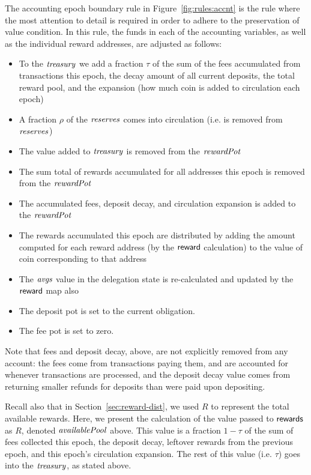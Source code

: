 The accounting epoch boundary rule in Figure~\ref{fig:rules:accnt} is the rule
where the most attention to detail is required in order to adhere to the
preservation of value condition. In this rule, the funds in each of the
accounting variables, as well as the individual reward addresses, are adjusted
as follows:

\begin{itemize}
\item To the $\mathit{treasury}$ we add a fraction $\tau$ of the sum of
the fees accumulated from transactions this epoch, the decay amount
of all current deposits, the total reward pool, and the expansion (how much
coin is added to circulation each epoch)
\item A fraction $\rho$ of the $\mathit{reserves}$ comes into circulation (i.e.
is removed from $\mathit{reserves}$)
\item The value added to $\mathit{treasury}$ is removed from the $\mathit{rewardPot}$
\item The sum total of rewards accumulated for all addresses this epoch
is removed from the $\mathit{rewardPot}$
\item The accumulated fees, deposit decay, and circulation expansion is
added to the $\mathit{rewardPot}$
\item The rewards accumulated this epoch are distributed by
adding the amount computed for each reward address (by the $\mathsf{reward}$ calculation)
to the value of coin corresponding to that address
\item The $\mathit{avgs}$ value in the delegation state is re-calculated and
updated by the $\mathsf{reward}$ map also
\item The deposit pot is set to the current obligation.
\item The fee pot is set to zero.
\end{itemize}

Note that fees and deposit decay, above, are not explicitly removed from any account:
the fees come from transactions paying them, and are accounted for whenever
transactions are processed, and the deposit decay value comes from returning
smaller refunds for deposits than were paid upon depositing.

Recall also that in Section~\ref{sec:reward-dist}, we used $R$ to represent
the total available rewards. Here, we present the calculation of the value
passed to $\mathsf{rewards}$ as $R$, denoted $\mathit{availablePool}$ above.
This value is a fraction $1-\tau$ of the sum of fees collected this epoch, the
deposit decay, leftover rewards from
the previous epoch, and this epoch's circulation expansion. The rest of this
value (i.e. $\tau$) goes into the $\mathit{treasury}$, as stated above.

